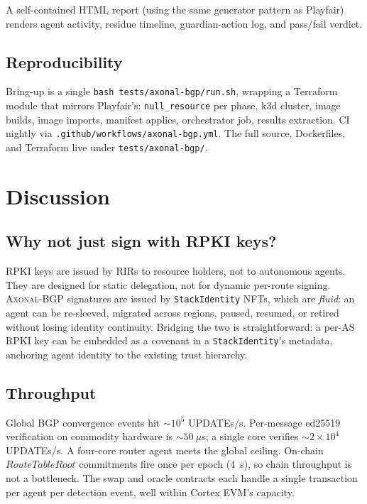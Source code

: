 \documentclass[11pt,twocolumn]{article}
\theoremstyle{definition}
\theoremstyle{plain}
\theoremstyle{remark}
\newcommand{\axonal}{\textsc{Axonal-BGP}}
\newcommand{\code}[1]{\texttt{#1}}
\begin{document}
A self-contained HTML report (using the same generator pattern as Playfair) renders agent activity, residue timeline, guardian-action log, and pass/fail verdict.

\subsection{Reproducibility}

Bring-up is a single \code{bash tests/axonal-bgp/run.sh}, wrapping a Terraform module that mirrors Playfair's: \code{null\_resource} per phase, k3d cluster, image builds, image imports, manifest applies, orchestrator job, results extraction. CI nightly via \code{.github/workflows/axonal-bgp.yml}. The full source, Dockerfiles, and Terraform live under \code{tests/axonal-bgp/}.

\section{Discussion}\label{sec:discussion}

\subsection{Why not just sign with RPKI keys?}

RPKI keys are issued by RIRs to resource holders, not to autonomous agents. They are designed for static delegation, not for dynamic per-route signing. \axonal{} signatures are issued by \code{StackIdentity} NFTs, which are \emph{fluid}: an agent can be re-sleeved, migrated across regions, paused, resumed, or retired without losing identity continuity. Bridging the two is straightforward: a per-AS RPKI key can be embedded as a covenant in a \code{StackIdentity}'s metadata, anchoring agent identity to the existing trust hierarchy.

\subsection{Throughput}

Global BGP convergence events hit ${\sim}10^{5}$ UPDATEs/s. Per-message ed25519 verification on commodity hardware is ${\sim}50~\mu$s; a single core verifies ${\sim}2 \times 10^{4}$ UPDATEs/s. A four-core router agent meets the global ceiling. On-chain $\mathit{RouteTableRoot}$ commitments fire once per epoch (4~s), so chain throughput is not a bottleneck. The swap and oracle contracts each handle a single transaction per agent per detection event, well within Cortex EVM's capacity.
\end{document}
